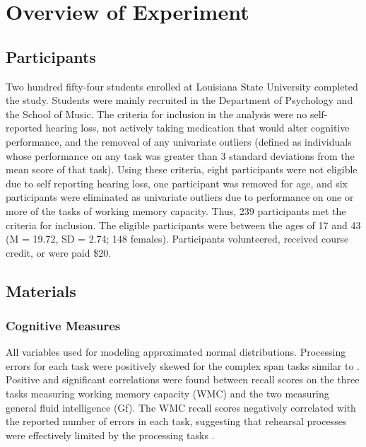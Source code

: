 \documentclass[]{book}
\begin{document}
\hypertarget{overview-of-experiment}{%
\section{Overview of Experiment}\label{overview-of-experiment}}

\hypertarget{participants}{%
\subsection{Participants}\label{participants}}

Two hundred fifty-four students enrolled at Louisiana State University completed the study.
Students were mainly recruited in the Department of Psychology and the School of Music.
The criteria for inclusion in the analysis were no self-reported hearing loss, not actively taking medication that would alter cognitive performance, and the removeal of any univariate outliers (defined as individuals whose performance on any task was greater than 3 standard deviations from the mean score of that task).
Using these criteria, eight participants were not eligible due to self reporting hearing loss, one participant was removed for age, and six participants were eliminated as univariate outliers due to performance on one or more of the tasks of working memory capacity.
Thus, 239 participants met the criteria for inclusion.
The eligible participants were between the ages of 17 and 43 (M = 19.72, SD = 2.74; 148 females).
Participants volunteered, received course credit, or were paid \$20.

\hypertarget{materials}{%
\subsection{Materials}\label{materials}}

\hypertarget{cognitive-measures}{%
\subsubsection{Cognitive Measures}\label{cognitive-measures}}

All variables used for modeling approximated normal distributions.
Processing errors for each task were positively skewed for the complex span tasks similar to \citet{unsworthComplexWorkingMemory2009}.
Positive and significant correlations were found between recall scores on the three tasks measuring working memory capacity (WMC) and the two measuring general fluid intelligence (Gf).
The WMC recall scores negatively correlated with the reported number of errors in each task, suggesting that rehearsal processes were effectively limited by the processing tasks \citep{unsworthComplexWorkingMemory2009}.
\end{document}
